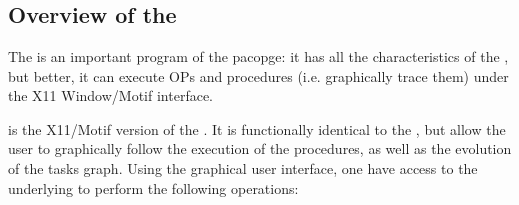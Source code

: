 
\part{\XPK{}}

\chapter*{Overview of the \XPK{}}

The \XPK{} is an important program of the \COPRSDE{} pacopge: it has
all the characteristics of the \CPK{}, but better, it can execute OPs and
procedures (i.e. graphically trace them) under the X11 Window/Motif
interface.

\XPK{} is the X11/Motif version of the \CPK{}. It is functionally identical to
the \CPK{}, but allow the user to graphically follow the execution of the
procedures, as well as the evolution of the tasks graph.  Using the graphical
user interface, one have access to the underlying
\CPK{} to perform the following operations:

